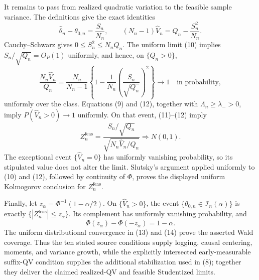 It remains to pass from realized quadratic variation to the feasible sample variance.  The definitions give the exact identities
\[
\widehat\theta_n-\theta_{0,n}=\frac{S_n}{N_n},
\qquad
(N_n-1)\widehat V_n=Q_n-\frac{S_n^2}{N_n}.
\tag{11}
\]
Cauchy--Schwarz gives \(0\le S_n^2\le N_nQ_n\).  The uniform limit (10) implies \(S_n/\sqrt{Q_n}=O_P(1)\) uniformly, and hence, on \(\{Q_n>0\}\),
\[
\frac{N_n\widehat V_n}{Q_n}
=\frac{N_n}{N_n-1}
\left\{1-\frac1{N_n}\left(\frac{S_n}{\sqrt{Q_n}}\right)^2\right\}
\longrightarrow1
\quad\text{in probability},
\tag{12}
\]
uniformly over the class.  Equations (9) and (12), together with \(\Lambda_n\ge\lambda_->0\), imply \(P(\widehat V_n>0)\to1\) uniformly.  On that event, (11)--(12) imply
\[
Z_n^{\mathrm{feas}}
=\frac{S_n/\sqrt{Q_n}}
{\sqrt{N_n\widehat V_n/Q_n}}
\Rightarrow N(0,1).
\tag{13}
\]
The exceptional event \(\{\widehat V_n=0\}\) has uniformly vanishing probability, so its stipulated value does not alter the limit.  Slutsky's argument applied uniformly to (10) and (12), followed by continuity of \(\Phi\), proves the displayed uniform Kolmogorov conclusion for \(Z_n^{\mathrm{feas}}\).

Finally, let \(z_\alpha=\Phi^{-1}(1-\alpha/2)\).  On \(\{\widehat V_n>0\}\), the event \(\{\theta_{0,n}\in\mathcal I_n(\alpha)\}\) is exactly \(\{|Z_n^{\mathrm{feas}}|\le z_\alpha\}\).  Its complement has uniformly vanishing probability, and
\[
\Phi(z_\alpha)-\Phi(-z_\alpha)=1-\alpha.
\tag{14}
\]
The uniform distributional convergence in (13) and (14) prove the asserted Wald coverage.  Thus the ten stated source conditions supply logging, causal centering, moments, and variance growth, while the explicitly intersected early-measurable suffix-QV condition supplies the additional stabilization used in (8); together they deliver the claimed realized-QV and feasible Studentized limits.